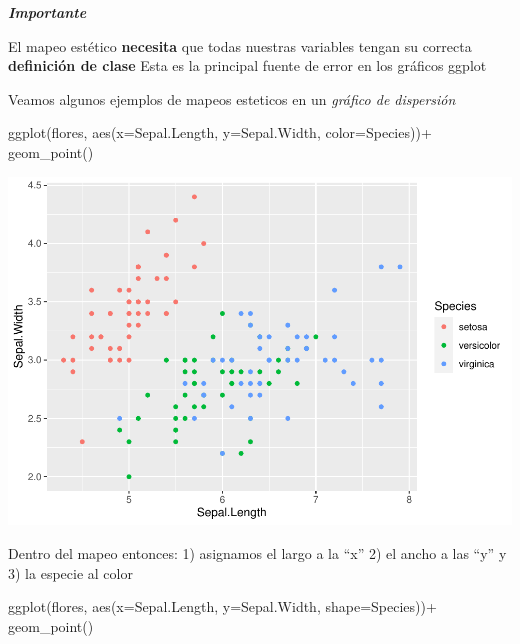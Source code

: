 \documentclass[
]{book}
\newenvironment{Shaded}{\begin{snugshade}}{\end{snugshade}}
\newcommand{\AttributeTok}[1]{\textcolor[rgb]{0.77,0.63,0.00}{#1}}
\newcommand{\FunctionTok}[1]{\textcolor[rgb]{0.00,0.00,0.00}{#1}}
\newcommand{\NormalTok}[1]{#1}
\newcommand{\SpecialCharTok}[1]{\textcolor[rgb]{0.00,0.00,0.00}{#1}}
\begin{document}
\textbf{\emph{Importante}}

El mapeo estético \textbf{necesita} que todas nuestras variables tengan su correcta \textbf{definición de clase} Esta es la principal fuente de error en los gráficos ggplot

Veamos algunos ejemplos de mapeos esteticos en un \emph{gráfico de dispersión}

\begin{Shaded}
\begin{Highlighting}[]
\FunctionTok{ggplot}\NormalTok{(flores, }\FunctionTok{aes}\NormalTok{(}\AttributeTok{x=}\NormalTok{Sepal.Length, }\AttributeTok{y=}\NormalTok{Sepal.Width, }\AttributeTok{color=}\NormalTok{Species))}\SpecialCharTok{+}
  \FunctionTok{geom\_point}\NormalTok{()}
\end{Highlighting}
\end{Shaded}

\includegraphics{Esatadistica_en_R_files/figure-latex/unnamed-chunk-143-1.pdf}

Dentro del mapeo entonces: 1) asignamos el largo a la ``x'' 2) el ancho a las ``y'' y 3) la especie al color

\begin{Shaded}
\begin{Highlighting}[]
\FunctionTok{ggplot}\NormalTok{(flores, }\FunctionTok{aes}\NormalTok{(}\AttributeTok{x=}\NormalTok{Sepal.Length, }\AttributeTok{y=}\NormalTok{Sepal.Width, }\AttributeTok{shape=}\NormalTok{Species))}\SpecialCharTok{+}
  \FunctionTok{geom\_point}\NormalTok{()}
\end{Highlighting}
\end{Shaded}
\end{document}
